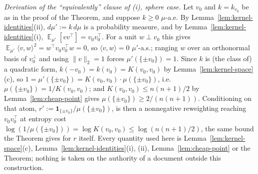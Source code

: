 \documentclass{aicr-solution}
\newcommand{\Expect}{\operatorname*{\mathbb{E}}}
\begin{document}
\begin{remark}[scope]
\medskip
\noindent\emph{Derivation of the ``equivalently'' clause of (i), sphere
case.} Let $v_{0}$ and $k = k_{v_{0}}$ be as in the proof of the
Theorem, and suppose $k \ge 0$ $\mu$-a.e. By
Lemma~\ref{lem:kernel-identities}(ii), $d\mu' := k\,d\mu$ is a
probability measure, and by Lemma~\ref{lem:kernel-identities}(i),
$\Expect_{\mu'}[vv^{\top}] = v_{0}v_{0}^{\top}$. For a unit $w \perp
v_{0}$ this gives $\Expect_{\mu'}\langle v,w\rangle^{2} = w^{\top}
v_{0}v_{0}^{\top}w = 0$, so $\langle v,w\rangle = 0$ $\mu'$-a.s.;
ranging $w$ over an orthonormal basis of $v_{0}^{\perp}$ and using
$\|v\|_{2} = 1$ forces $\mu'(\{\pm v_{0}\}) = 1$. Since $k$ is (the
class of) a quadratic form, $k(-v_{0}) = k(v_{0}) = K(v_{0},v_{0})$ by
Lemma~\ref{lem:kernel-space}(c), so $1 = \mu'(\{\pm v_{0}\}) =
K(v_{0},v_{0})\cdot\mu(\{\pm v_{0}\})$, i.e.\ $\mu(\{\pm v_{0}\}) =
1/K(v_{0},v_{0})$; and $K(v_{0},v_{0}) \le n(n+1)/2$ by
Lemma~\ref{lem:cheap-point} gives $\mu(\{\pm v_{0}\}) \ge
2/(n(n+1))$. Conditioning on that atom, $r' := \mathbf{1}_{\{\pm
v_{0}\}}/\mu(\{\pm v_{0}\})$, is then a nonnegative reweighting
reaching $v_{0}v_{0}^{\top}$ at entropy cost $\log(1/\mu(\{\pm
v_{0}\})) = \log K(v_{0},v_{0}) \le \log(n(n+1)/2)$, the same bound the
Theorem gives for $r$ itself. Every quantity used here is
Lemma~\ref{lem:kernel-space}(c), Lemma~\ref{lem:kernel-identities}(i),
(ii), Lemma~\ref{lem:cheap-point} or the Theorem; nothing is taken on
the authority of a document outside this construction.


\end{remark}
\end{document}
